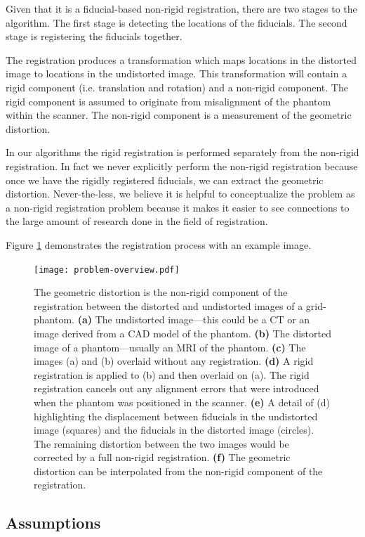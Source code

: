 \documentclass[12pt]{article}
\begin{document}
Given that it is a fiducial-based non-rigid registration, there are two stages to the algorithm.  The first stage is detecting the locations of the fiducials.  The second stage is registering the fiducials together.

The registration produces a transformation which maps locations in the distorted image to locations in the undistorted image.  This transformation will contain a rigid component (i.e. translation and rotation) and a non-rigid component.  The rigid component is assumed to originate from misalignment of the phantom within the scanner.  The non-rigid component is a measurement of the geometric distortion.

In our algorithms the rigid registration is performed separately from the non-rigid registration.  In fact we never explicitly perform the non-rigid registration because once we have the rigidly registered fiducials, we can extract the geometric distortion.  Never-the-less, we believe it is helpful to conceptualize the problem as a non-rigid registration problem because it makes it easier to see connections to the large amount of research done in the field of registration.

Figure \ref{fig:problem-overview} demonstrates the registration process with an example image.

\begin{figure}
    \centering
    \texttt{[image: problem-overview.pdf]}
    \caption{The geometric distortion is the non-rigid component of the registration between the distorted and undistorted images of a grid-phantom. \textbf{(a)} The undistorted image---this could be a CT or an image derived from a CAD model of the phantom.  \textbf{(b)} The distorted image of a phantom---usually an MRI of the phantom.  \textbf{(c)} The images (a) and (b) overlaid without any registration.  \textbf{(d)} A rigid registration is applied to (b) and then overlaid on (a).  The rigid registration cancels out any alignment errors that were introduced when the phantom was positioned in the scanner. \textbf{(e)} A detail of (d) highlighting the displacement between fiducials in the undistorted image (squares) and the fiducials in the distorted image (circles).  The remaining distortion between the two images would be corrected by a full non-rigid registration. \textbf{(f)} The geometric distortion can be interpolated from the non-rigid component of the registration.}
    \label{fig:problem-overview}
\end{figure}

\subsection{Assumptions}
\end{document}

